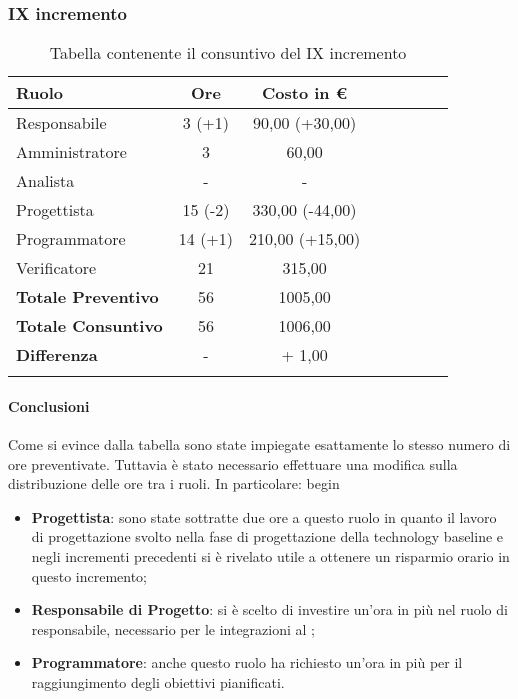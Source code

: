 \subsubsection{IX incremento}\label{_consuntivoTerm2}
\begin{longtable}{|l|c|c|c|c|c|c|c|}
	\hline
	\rowcolor{lighter-grayer}
	\textbf{Ruolo}             & \textbf{Ore} & \textbf{Costo in €} \\
	\hline
	\endfirsthead

	\hline
	Responsabile               & 3 (+1)           & 90,00 (+30,00)    \\
	\hline
	\hline
	Amministratore             & 3       & 60,00      \\
	\hline
	\hline
	Analista                   & -       & -   \\
	\hline
	\hline
	Progettista                & 15 (-2)          & 330,00 (-44,00)              \\
	\hline
	\hline
	Programmatore              & 14 (+1)           & 210,00 (+15,00)                 \\
	\hline
	\hline
	Verificatore               & 21       & 315,00    \\
	\hline
	\textbf{Totale Preventivo} & 56          & 1005,00            \\
	\hline
	\hline
	\textbf{Totale Consuntivo} & 56          & 1006,00            \\
	\hline
	\hline
	\textbf{Differenza}        & -           & + 1,00           \\
	\hline
	\rowcolor{white}
	\caption{Tabella contenente il consuntivo del IX incremento}
\end{longtable}
\paragraph{Conclusioni}
Come si evince dalla tabella sono state impiegate esattamente lo stesso numero di ore preventivate. Tuttavia è stato necessario effettuare una modifica sulla distribuzione delle ore tra i ruoli. In particolare:
begin\begin{itemize}
	\item \textbf{Progettista}: sono state sottratte due ore a questo ruolo in quanto il lavoro di progettazione svolto nella fase di progettazione della technology baseline e negli incrementi precedenti si è rivelato utile a ottenere un risparmio orario in questo incremento;
	\item \textbf{Responsabile di Progetto}: si è scelto di investire un'ora in più nel ruolo di responsabile, necessario per le integrazioni al ;
	\item \textbf{Programmatore}: anche questo ruolo ha richiesto un'ora in più per il raggiungimento degli obiettivi pianificati.
\end{itemize} 

